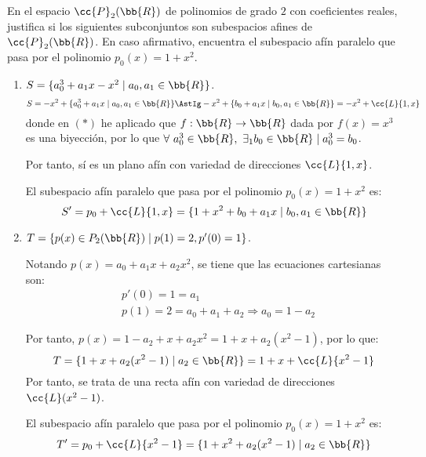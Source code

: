 \begin{ejercicio}
    En el espacio $\cc{P}_2(\bb{R})$ de polinomios de grado $2$ con coeficientes reales,     justifica si los siguientes subconjuntos son subespacios afines de $\cc{P}_2(\bb{R})$. En caso afirmativo, encuentra el subespacio afín paralelo que pasa por el polinomio $p_0(x) = 1 + x^2$.
    \begin{enumerate}
        \item $S = \{a_0^3 + a_1x - x^2 \mid a_0,a_1 \in \bb{R}\}$.
        \begin{equation*}
            S = - x^2 + \{a_0^3 + a_1x \mid a_0,a_1 \in \bb{R}\} \AstIg - x^2 + \{b_0 + a_1x \mid b_0,a_1 \in \bb{R}\} = -x^2 + \cc{L}\{1,x\}
        \end{equation*}
        donde en $(\ast)$ he aplicado que $f:\bb{R}\to \bb{R}$ dada por $f(x)=x^3$ es una biyección, por lo que $\forall~a_0^3\in \bb{R},~\exists_1 b_0\in \bb{R}\mid a_0^3=b_0$.
        
        Por tanto, sí es un plano afín con variedad de direcciones $\cc{L}\{1,x\}$.

        El subespacio afín paralelo que pasa por el polinomio $p_0(x) = 1 + x^2$ es:
        $$S'=p_0 + \cc{L}\{1,x\} = \{1+x^2+b_0 + a_1x\mid b_0,a_1\in \bb{R}\}$$
        
        \item $T = \{p(x) \in P_2(\bb{R}) \mid p(1) = 2, p'(0) = 1\}$.

        Notando $p(x)=a_0+a_1x+a_2x^2$, se tiene que las ecuaciones cartesianas son:
        \begin{align*}
            &p'(0)= 1=a_1\\
            &p(1)=2=a_0+a_1+a_2 \Longrightarrow a_0=1-a_2
        \end{align*}

        Por tanto, $p(x)=1-a_2 + x+a_2x^2=1+x + a_2(x^2-1)$, por lo que:
        $$T=\{1+x+a_2(x^2-1)\mid a_2\in \bb{R}\} = 1+x+\cc{L}\{x^2-1\}$$
        Por tanto, se trata de una recta afín con variedad de direcciones $\cc{L}(x^2-1)$.

        El subespacio afín paralelo que pasa por el polinomio $p_0(x) = 1 + x^2$ es:
        $$T'=p_0 + \cc{L}\{x^2-1\} = \{1+x^2+a_2(x^2-1)\mid a_2\in \bb{R}\}$$
    \end{enumerate}
\end{ejercicio}



